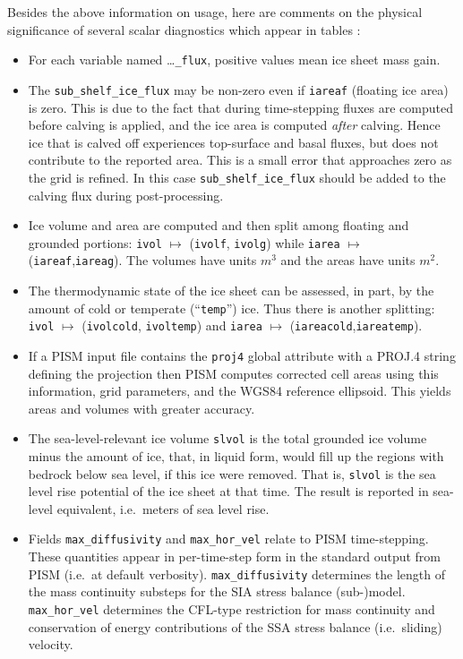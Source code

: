 Besides the above information on usage, here are comments on the physical significance of several scalar diagnostics which appear in tables \alltsvars:
\begin{itemize}
  \item For each variable named \dots\texttt{_flux}, positive values mean ice sheet mass gain.
  \item The \texttt{sub_shelf_ice_flux} may be non-zero even if \texttt{iareaf} (floating ice area) is zero. This is due to the fact that during time-stepping fluxes are computed before calving is applied, and the ice area is computed \emph{after} calving. Hence ice that is calved off experiences top-surface and basal fluxes, but does not contribute to the reported area. This is a small error that approaches zero as the grid is refined. In this case \texttt{sub_shelf_ice_flux} should be added to the calving flux during post-processing.
  \item Ice volume and area are computed and then split among floating and grounded portions: \texttt{ivol} $\mapsto$ (\texttt{ivolf}, \texttt{ivolg}) while \texttt{iarea} $\mapsto$ (\texttt{iareaf},\texttt{iareag}).  The volumes have units \textsl{$m^3$} and the areas have units \textsl{$m^2$}.
  \item The thermodynamic state of the ice sheet can be assessed, in part, by the amount of cold or temperate (``\texttt{temp}'') ice.  Thus there is another splitting: \texttt{ivol} $\mapsto$ (\texttt{ivolcold}, \texttt{ivoltemp}) and \texttt{iarea} $\mapsto$ (\texttt{iareacold},\texttt{iareatemp}).
  \item If a PISM input file contains the \texttt{proj4} global attribute with a PROJ.4 string defining the projection then PISM computes corrected cell areas
using this information, grid parameters, and the WGS84 reference ellipsoid. This yields areas and volumes with greater accuracy.
  \item The sea-level-relevant ice volume \texttt{slvol} is the total grounded ice volume minus the amount of ice, that, in liquid form, would fill up the regions with bedrock below sea level, if this ice were removed.  That is, \texttt{slvol} is the sea level rise potential of the ice sheet at that time.  The result is reported  in sea-level equivalent, i.e.~meters of sea level rise.
  \item Fields \texttt{max_diffusivity} and \texttt{max_hor_vel} relate to PISM time-stepping.  These quantities appear in per-time-step form in the standard output from PISM (i.e.~at default verbosity).  \texttt{max_diffusivity} determines the length of the mass continuity substeps for the SIA stress balance (sub-)model.  \texttt{max_hor_vel} determines the CFL-type restriction for mass continuity and conservation of energy contributions of the SSA stress balance (i.e.~sliding) velocity.
\end{itemize}

